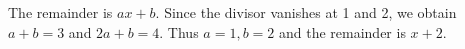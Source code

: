 The remainder is $ax+b$. Since the divisor vanishes at 1 and 2, we obtain $a+b=3$ and $2a+b=4$. Thus $a=1,b=2$ and the remainder is $\boxed{x+2}$.

